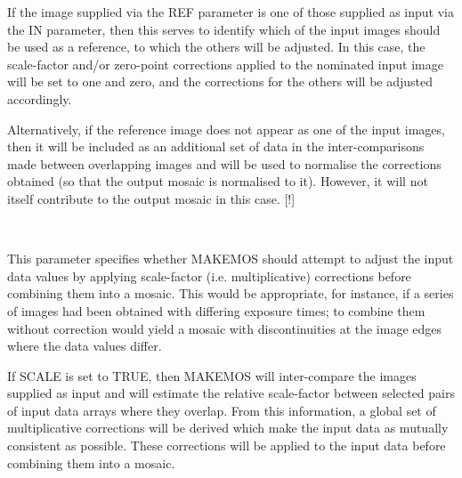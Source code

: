 \documentclass[twoside,11pt]{article}
\renewcommand{\_}{\texttt{\symbol{95}}}
\newcommand{\routine}[1]{{\sc #1}}
\newcommand{\sstsubsection}[1]{ \item[{#1}] \mbox{} \\}
\newcommand{\sstsubsection}[1]{\item[{#1}]}
\begin{document}
{{{         If the image supplied via the REF parameter is one of those
         supplied as input via the IN parameter, then this serves to
         identify which of the input images should be used as a
         reference, to which the others will be adjusted. In this case,
         the scale-factor and/or zero-point corrections applied to the
         nominated input image will be set to one and zero, and the
         corrections for the others will be adjusted accordingly.

         Alternatively, if the reference image does not appear as one of
         the input images, then it will be included as an additional set
         of data in the inter-comparisons made between overlapping images
         and will be used to normalise the corrections obtained (so
         that the output mosaic is normalised to it). However, it will
         not itself contribute to the output mosaic in this case.
         [!]
      }
      \sstsubsection{
         SCALE = \_LOGICAL (Read)
      } {
         This parameter specifies whether \routine{MAKEMOS} should attempt to
         adjust the input data values by applying scale-factor (i.e.
         multiplicative) corrections before combining them into a
         mosaic. This would be appropriate, for instance, if a series
         of images had been obtained with differing exposure times; to
         combine them without correction would yield a mosaic with
         discontinuities at the image edges where the data values
         differ.

         If SCALE is set to TRUE, then \routine{MAKEMOS} will inter-compare the
         images supplied as input and will estimate the relative
         scale-factor between selected pairs of input data arrays where
         they overlap.  From this information, a global set of
         multiplicative corrections will be derived which make the
         input data as mutually consistent as possible. These
         corrections will be applied to the input data before combining
         them into a mosaic.

}}}
\end{document}
